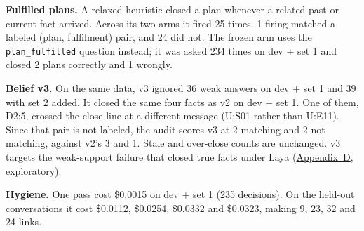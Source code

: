 \documentclass[11pt]{article}
\newcommand{\src}[1]{}
\begin{document}
\textbf{Fulfilled plans.} A relaxed heuristic closed a plan whenever a related past or current fact arrived. Across its two arms it fired 25\src{bench/results/e2\_jev\_v2\_\_dev\_updates.json + bench/results/e3\_structural\_v2\_\_dev\_updates.json (fulfills\_log) vs bench/updates\_conv26.json close\_fulfilled pairs} times. 1\src{bench/results/e2\_jev\_v2\_\_dev\_updates.json + bench/results/e3\_structural\_v2\_\_dev\_updates.json (fulfills\_log) vs bench/updates\_conv26.json close\_fulfilled pairs} firing matched a labeled (plan, fulfilment) pair, and 24\src{bench/results/e2\_jev\_v2\_\_dev\_updates.json + bench/results/e3\_structural\_v2\_\_dev\_updates.json (fulfills\_log) vs bench/updates\_conv26.json close\_fulfilled pairs} did not. The frozen arm uses the \texttt{plan\_\allowbreak{}fulfilled} question instead; it was asked 234\src{bench/results/e4\_belief\_v2\_\_dev\_updates\_\_k3.json} times on dev + set 1 and closed 2\src{bench/results/e4\_belief\_v2\_\_dev\_updates\_\_k3.json} plans correctly and 1\src{bench/results/e4\_belief\_v2\_\_dev\_updates\_\_k3.json} wrongly.

\textbf{Belief v3.} On the same data, v3 ignored 36\src{bench/results/e4\_belief\_v3\_\_dev\_updates\_\_k3\_\_noanswer.json} weak answers on dev + set 1 and 39\src{bench/results/e4\_belief\_v3\_\_dev\_updates2\_\_k3\_\_noanswer.json} with set 2 added. It closed the same four facts as v2 on dev + set 1. One of them, D2:5, crossed the close line at a different message (U:S01 rather than U:E11). Since that pair is not labeled, the audit scores v3 at 2\src{bench/results/e4\_belief\_v3\_\_dev\_updates\_\_k3\_\_noanswer.json} matching and 2\src{bench/results/e4\_belief\_v3\_\_dev\_updates\_\_k3\_\_noanswer.json} not matching, against v2's 3\src{bench/results/e4\_belief\_v2\_\_dev\_updates\_\_k3.json} and 1\src{bench/results/e4\_belief\_v2\_\_dev\_updates\_\_k3.json}. Stale and over-close counts are unchanged. v3 targets the weak-support failure that closed true facts under Laya (\hyperref[app:D]{Appendix~D}, exploratory).

\textbf{Hygiene.} One pass cost \$0.0015\src{bench/results/e4\_belief\_v2\_\_dev\_updates\_\_k3.json} on dev + set 1 (235\src{bench/results/e4\_belief\_v2\_\_dev\_updates\_\_k3.json} decisions). On the held-out conversations it cost \$0.0112\src{bench/results/e4\_belief\_v2\_\_heldout\_conv-30\_\_k3.json}, \$0.0254\src{bench/results/e4\_belief\_v2\_\_heldout\_conv-41\_\_k3.json}, \$0.0332\src{bench/results/e4\_belief\_v2\_\_heldout\_conv-42\_\_k3.json} and \$0.0323\src{bench/results/e4\_belief\_v2\_\_heldout\_conv-43\_\_k3.json}, making 9\src{bench/results/e4\_belief\_v2\_\_heldout\_conv-30\_\_k3.json}, 23\src{bench/results/e4\_belief\_v2\_\_heldout\_conv-41\_\_k3.json}, 32\src{bench/results/e4\_belief\_v2\_\_heldout\_conv-42\_\_k3.json} and 24\src{bench/results/e4\_belief\_v2\_\_heldout\_conv-43\_\_k3.json} links.
\end{document}
